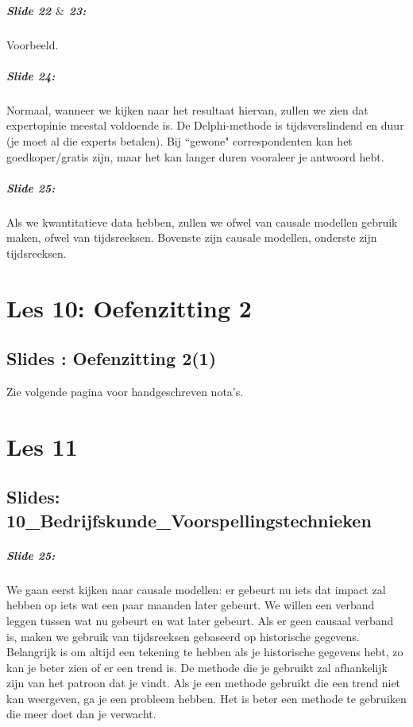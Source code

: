 \documentclass[10pt,a4paper]{report}
\begin{document}
\paragraph{Slide 22 $\&$ 23:} Voorbeeld.

\paragraph{Slide 24:} Normaal, wanneer we kijken naar het resultaat hiervan, zullen we zien dat expertopinie meestal voldoende is. De Delphi-methode is tijdsverslindend en duur (je moet al die experts betalen). Bij ``gewone" correspondenten kan het goedkoper/gratis zijn, maar het kan langer duren vooraleer je antwoord hebt. 

\paragraph{Slide 25:} Als we kwantitatieve data hebben, zullen we ofwel van causale modellen gebruik maken, ofwel van tijdsreeksen. Bovenste zijn causale modellen, onderste zijn tijdsreeksen.

\chapter{Les 10: Oefenzitting 2}
\section{Slides	: Oefenzitting 2(1)}
Zie volgende pagina voor handgeschreven nota's.

 

\chapter{Les 11}

\section{Slides: 10\_Bedrijfskunde\_Voorspellingstechnieken}

\paragraph{Slide 25:} We gaan eerst kijken naar causale modellen: er gebeurt nu iets dat impact zal hebben op iets wat een paar maanden later gebeurt. We willen een verband leggen tussen wat nu gebeurt en wat later gebeurt.
Als er geen causaal verband is, maken we gebruik van tijdsreeksen gebaseerd op historische gegevens.\\
Belangrijk is om altijd een tekening te hebben als je historische gegevens hebt, zo kan je beter zien of er een trend is. De methode die je gebruikt zal afhankelijk zijn van het patroon dat je vindt. Als je een methode gebruikt die een trend niet kan weergeven, ga je een probleem hebben. Het is beter een methode te gebruiken die meer doet dan je verwacht. 
\end{document}
